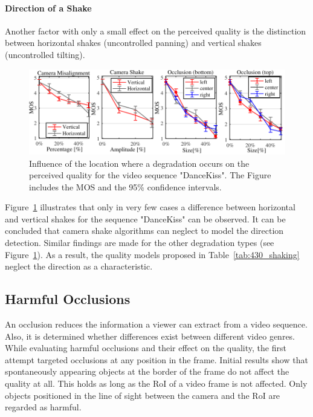 \paragraph{Direction of a Shake}
Another factor with only a small effect on the perceived quality is the distinction between horizontal shakes (uncontrolled panning) and vertical shakes (uncontrolled tilting). 

\begin{figure}[ht]
	\centering
	\includegraphics{gfx/400_UGV_Quality/location_relevance.pdf}
	\caption[Influence of the location where a degradation occurs on the perceived quality]{Influence of the location where a degradation occurs on the perceived quality for the video sequence "DanceKiss".
		The Figure includes the \ac{MOS} and the 95\% confidence intervals.}
	\label{fig:430_location_relevance}
\end{figure}
Figure~\ref{fig:430_location_relevance} illustrates that only in very few cases a difference between horizontal and vertical shakes for the sequence "DanceKiss" can be observed.
It can be concluded that camera shake algorithms can neglect to model the direction detection.
Similar findings are made for the other degradation types (see Figure~\ref{fig:430_location_relevance}).
As a result, the quality models proposed in Table~\ref{tab:430_shaking} neglect the direction as a characteristic.
\subsection{Harmful Occlusions}
\label{sec:430_results_occlusions}
An occlusion reduces the information a viewer can extract from a video sequence. 
Also, it is determined whether differences exist between different video genres. 
While evaluating harmful occlusions and their effect on the quality, the first attempt targeted occlusions at any position in the frame. 
Initial results show that spontaneously appearing objects at the border of the frame do not affect the quality at all.
This holds as long as the \ac{RoI} of a video frame is not affected. 
Only objects positioned in the line of sight between the camera and the \ac{RoI} are regarded as harmful.

